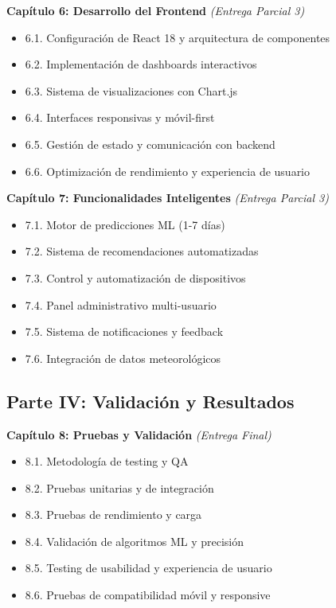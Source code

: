 \documentclass[12pt,a4paper,spanish]{article}
\begin{document}
\textbf{Capítulo 6: Desarrollo del Frontend} \textit{(Entrega Parcial 3)}
\begin{itemize}
    \item 6.1. Configuración de React 18 y arquitectura de componentes
    \item 6.2. Implementación de dashboards interactivos
    \item 6.3. Sistema de visualizaciones con Chart.js
    \item 6.4. Interfaces responsivas y móvil-first
    \item 6.5. Gestión de estado y comunicación con backend
    \item 6.6. Optimización de rendimiento y experiencia de usuario
\end{itemize}

\textbf{Capítulo 7: Funcionalidades Inteligentes} \textit{(Entrega Parcial 3)}
\begin{itemize}
    \item 7.1. Motor de predicciones ML (1-7 días)
    \item 7.2. Sistema de recomendaciones automatizadas
    \item 7.3. Control y automatización de dispositivos
    \item 7.4. Panel administrativo multi-usuario
    \item 7.5. Sistema de notificaciones y feedback
    \item 7.6. Integración de datos meteorológicos
\end{itemize}

\subsection{Parte IV: Validación y Resultados}

\textbf{Capítulo 8: Pruebas y Validación} \textit{(Entrega Final)}
\begin{itemize}
    \item 8.1. Metodología de testing y QA
    \item 8.2. Pruebas unitarias y de integración
    \item 8.3. Pruebas de rendimiento y carga
    \item 8.4. Validación de algoritmos ML y precisión
    \item 8.5. Testing de usabilidad y experiencia de usuario
    \item 8.6. Pruebas de compatibilidad móvil y responsive
\end{itemize}
\end{document}
